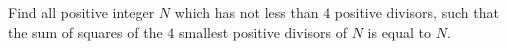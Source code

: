 Find all positive integer $N$ which has not less than $4$ positive divisors, such that the sum of squares of the $4$ smallest positive divisors of $N$ is equal to $N$.